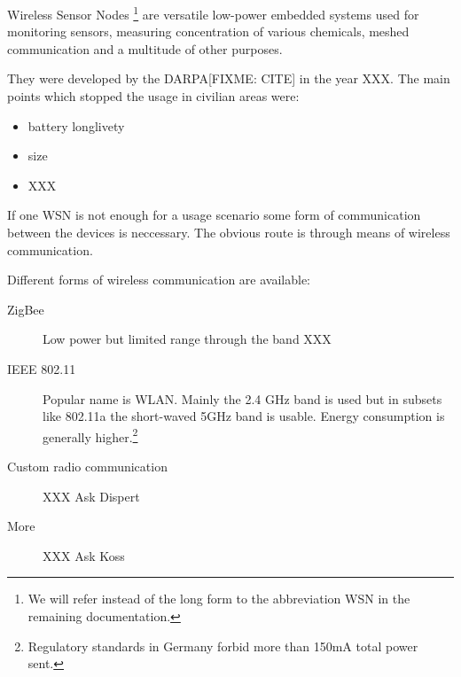 Wireless Sensor Nodes \footnote{We will refer instead of the long form to the abbreviation \textsc{WSN} in the remaining documentation.}
are versatile low-power embedded systems used for monitoring sensors, measuring concentration of various chemicals, meshed communication
and a multitude of other purposes.

They were developed by the DARPA[FIXME: CITE] in the year XXX. The main points which stopped the usage in civilian areas were:

\begin{itemize}
\item battery longlivety
\item size
\item XXX
\end{itemize}

If one \textsc{WSN} is not enough for a usage scenario some form of communication between the devices is neccessary. The obvious
route is through means of wireless communication.

Different forms of wireless communication are available:

\begin{description}
\item[ZigBee] Low power but limited range through the band XXX
\item[IEEE 802.11] Popular name is \textsc{WLAN}. Mainly the 2.4 GHz band is used but in subsets like 802.11a the short-waved 5GHz band is usable.
Energy consumption is generally higher.\footnote{Regulatory standards in Germany forbid more than 150mA total power sent.}
\item[Custom radio communication] XXX Ask Dispert
\item[More] XXX Ask Koss
\end{description}
